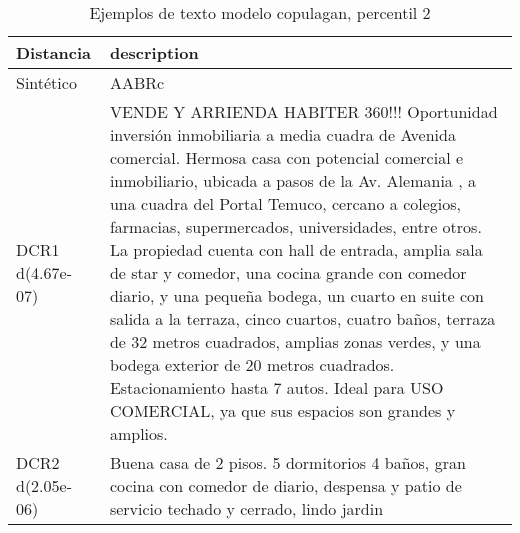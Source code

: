 \begin{table}[H]
\centering
\fontsize{10}{14}\selectfont
\caption{Ejemplos de texto modelo copulagan, percentil 2}
\label{table-example-economicos-a-1-copulagan-2p-text}
\begin{tabular}{|l|m{35em}|}
\hline
\rowcolor[gray]{0.8}
Distancia & description \\
\hline Sintético & AABRc \\
\hline DCR1 d(4.67e-07) & VENDE Y ARRIENDA HABITER 360!!!  Oportunidad inversi\'on inmobiliaria a media cuadra de Avenida comercial.  Hermosa casa con potencial comercial e inmobiliario, ubicada a pasos de la Av. Alemania , a una cuadra del Portal Temuco, cercano a colegios, farmacias, supermercados, universidades, entre otros.  La propiedad cuenta con hall de entrada, amplia sala de star y comedor, una cocina grande con comedor diario, y una peque\~na bodega, un cuarto en suite con salida a la terraza, cinco cuartos, cuatro ba\~nos, terraza de 32 metros cuadrados, amplias zonas verdes, y una bodega exterior de 20 metros cuadrados.  Estacionamiento hasta 7 autos.  Ideal para USO COMERCIAL, ya que sus espacios son grandes y amplios. \\
\hline DCR2 d(2.05e-06) & Buena casa de 2 pisos. 5 dormitorios 4 ba\~nos, gran cocina con comedor de diario, despensa y patio de servicio techado y cerrado, lindo jardin \\
\hline
\end{tabular}
\end{table}

